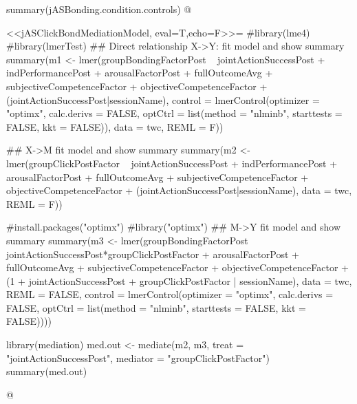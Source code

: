 summary(jASBonding.condition.controls)
@





<<jASClickBondMediationModel, eval=T,echo=F>>=
#library(lme4)
#library(lmerTest)
## Direct relationship X->Y: fit model and show summary
summary(m1 <- lmer(groupBondingFactorPost ~ jointActionSuccessPost +
                            indPerformancePost + arousalFactorPost + fullOutcomeAvg +
                            subjectiveCompetenceFactor + objectiveCompetenceFactor +
                            (jointActionSuccessPost|sessionName),
                            control = lmerControl(optimizer = "optimx", calc.derivs = FALSE, optCtrl = list(method = "nlminb", starttests = FALSE, kkt = FALSE)),
                            data = twc,
                            REML = F))

## X->M fit model and show summary
summary(m2 <- lmer(groupClickPostFactor ~ jointActionSuccessPost +
                                          indPerformancePost + arousalFactorPost + fullOutcomeAvg +
                                          subjectiveCompetenceFactor + objectiveCompetenceFactor +
                                          (jointActionSuccessPost|sessionName),
                                          data = twc,
                                          REML = F))

#install.packages("optimx")
#library("optimx")
## M->Y fit model and show summary
summary(m3 <- lmer(groupBondingFactorPost ~ jointActionSuccessPost*groupClickPostFactor +
                                            arousalFactorPost + fullOutcomeAvg +
                                            subjectiveCompetenceFactor + objectiveCompetenceFactor + (1 + jointActionSuccessPost + groupClickPostFactor | sessionName),
                                            data = twc, REML = FALSE, control = lmerControl(optimizer = "optimx", calc.derivs = FALSE, optCtrl = list(method = "nlminb", starttests = FALSE, kkt = FALSE))))

library(mediation)
med.out <- mediate(m2, m3, treat = "jointActionSuccessPost", mediator = "groupClickPostFactor")
summary(med.out)


@
